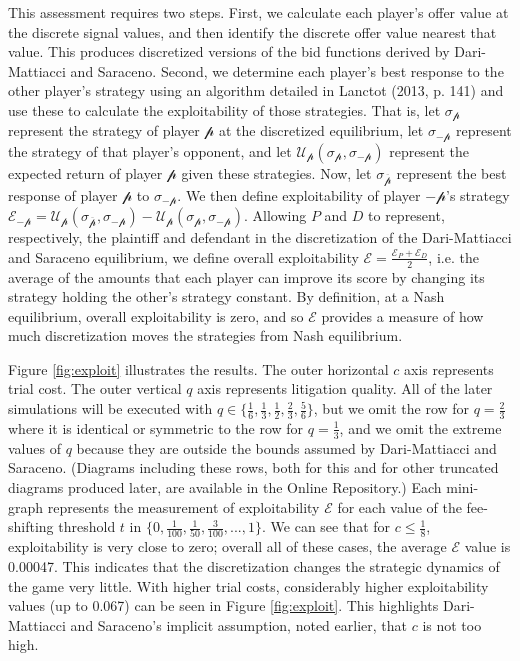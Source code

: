\documentclass{article}
\begin{document}
This assessment requires two steps. First, we calculate each player's offer value at the discrete signal values, and then identify the discrete offer value nearest that value. This produces discretized versions of the bid functions derived by Dari-Mattiacci and Saraceno. Second, we determine each player's best response to the other player's strategy using an algorithm detailed in Lanctot (2013, p. 141) \cite{lanctot2} and use these to calculate the exploitability of those strategies. That is, let $\sigma_{\mathcal{p}}$ represent the strategy of player $\mathcal{p}$ at the discretized equilibrium, let $\sigma_{-\mathcal{p}}$ represent the strategy of that player's opponent, and let $\mathcal{U}_{\mathcal{p}}(\sigma_{\mathcal{p}}, \sigma_{-\mathcal{p}})$ represent the expected return of player $\mathcal{p}$ given these strategies. Now, let $\sigma_{\overline{\mathcal{p}}}$ represent the best response of player $\mathcal{p}$ to $\sigma_{-\mathcal{p}}$. We then define exploitability of player $-\mathcal{p}$'s strategy $\mathcal{E}_{-\mathcal{p}} = \mathcal{U}_{\mathcal{p}}(\sigma_{\mathcal{\overline{p}}}, \sigma_{-\mathcal{p}}) - \mathcal{U}_{\mathcal{p}}(\sigma_{\mathcal{p}}, \sigma_{-\mathcal{p}})$. Allowing $P$ and $D$ to represent, respectively, the plaintiff and defendant in the discretization of the Dari-Mattiacci and Saraceno equilibrium, we define overall exploitability $\mathcal{E} = \frac{\mathcal{E}_P + \mathcal{E}_D}{2}$, i.e. the average of the amounts that each player can improve its score by changing its strategy holding the other's strategy constant. By definition, at a Nash equilibrium, overall exploitability is zero, and so $\mathcal{E}$ provides a measure of how much discretization moves the strategies from Nash equilibrium. 

Figure \ref{fig:exploit} illustrates the results. The outer horizontal $c$ axis represents trial cost. The outer vertical $q$ axis represents litigation quality. All of the later simulations will be executed with $q \in \{ \frac{1}{6}, \frac{1}{3}, \frac{1}{2}, \frac{2}{3}, \frac{5}{6} \}$, but we omit the row for $q = \frac{2}{3}$ where it is identical or symmetric to the row for $q = \frac{1}{3}$, and we omit the extreme values of $q$ because they are outside the bounds assumed by Dari-Mattiacci and Saraceno. (Diagrams including these rows, both for this and for other truncated diagrams produced later, are available in the Online Repository.) Each mini-graph represents the measurement of exploitability $\mathcal{E}$ for each value of the fee-shifting threshold $t$ in $\{0, \frac{1}{100}, \frac{1}{50}, \frac{3}{100}, ... , 1\}$. We can see that for $c \leq \frac{1}{8}$, exploitability is very close to zero; overall all of these cases, the average $\mathcal{E}$ value is 0.00047. This indicates that the discretization changes the strategic dynamics of the game very little. With higher trial costs, considerably higher exploitability values (up to 0.067) can be seen in Figure \ref{fig:exploit}. This highlights Dari-Mattiacci and Saraceno's implicit assumption, noted earlier, that $c$ is not too high.
\end{document}
